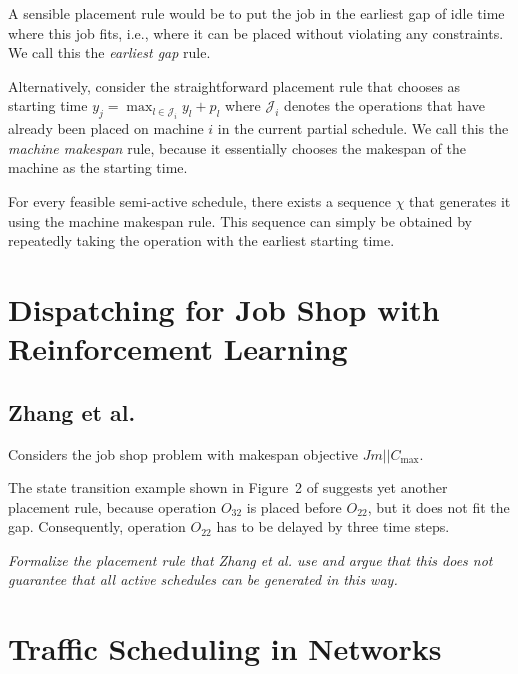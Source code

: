 \documentclass{article}
\theoremstyle{definition}
\theoremstyle{plain}
\begin{document}
A sensible placement rule would be to put the job in the earliest gap of idle
time where this job fits, i.e., where it can be placed without violating any
constraints. We call this the \textit{earliest gap} rule.

Alternatively, consider the straightforward placement rule that chooses as
starting time $y_j = \max_{l \in \mathcal{J}_i} y_l + p_l$ where $\mathcal{J}_i$
denotes the operations that have already been placed on machine $i$ in the
current partial schedule. We call this the \textit{machine makespan} rule,
because it essentially chooses the makespan of the machine as the starting time.

For every feasible semi-active schedule, there exists a sequence $\chi$ that
generates it using the machine makespan rule. This sequence can simply be
obtained by repeatedly taking the operation with the earliest starting time.


\newpage

\section{Dispatching for Job Shop with Reinforcement Learning}

\subsection{Zhang et al.}

Considers the job shop problem with makespan objective $Jm || C_\text{max}$.

The state transition example shown in Figure~2 of
\cite{zhangLearningDispatchJob2020} suggests yet another placement rule, because
operation $O_{32}$ is placed before $O_{22}$, but it does not fit the gap.
Consequently, operation $O_{22}$ has to be delayed by three time steps.

\textit{\color{blue}Formalize the placement rule that Zhang et al. use and argue
that this does not guarantee that all active schedules can be generated in this
way.}



\newpage

\section{Traffic Scheduling in Networks}
\end{document}
